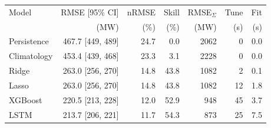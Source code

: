 \begin{tabular}{lrrrrrr}
\toprule
Model & RMSE [95\% CI] & nRMSE & Skill & RMSE$_{\Sigma}$ & Tune & Fit \\
 & (MW) & (\%) & (\%) & (MW) & (s) & (s) \\
\midrule
Persistence & 467.7 [449, 489] & 24.7 & 0.0 & 2062 & 0 & 0.0 \\
Climatology & 453.4 [439, 468] & 23.3 & 3.1 & 2228 & 0 & 0.0 \\
Ridge & 263.0 [256, 270] & 14.8 & 43.8 & 1082 & 2 & 0.1 \\
Lasso & 263.0 [256, 270] & 14.8 & 43.8 & 1082 & 12 & 1.8 \\
XGBoost & 220.5 [213, 228] & 12.0 & 52.9 & 948 & 45 & 3.7 \\
LSTM & 213.7 [206, 221] & 11.7 & 54.3 & 873 & 25 & 7.5 \\
\bottomrule
\end{tabular}